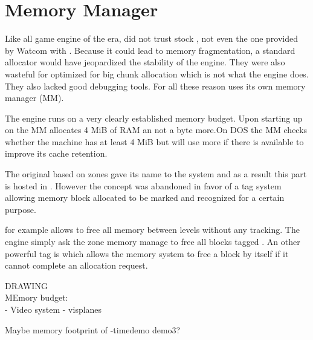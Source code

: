 \section{Memory Manager}
Like all game engine of the era, \doom did not trust stock , not even the one provided by Watcom with . Because it could lead to memory fragmentation, a standard allocator would have jeopardized the stability of the engine. They were also wasteful for optimized for big chunk allocation which is not what the engine does. They also lacked good debugging tools. For all these reason \doom uses its own memory manager (MM).\\
\par

The engine runs on a very clearly established memory budget. Upon starting up on \NeXT the MM allocates 4 MiB of RAM an not a byte more.On DOS the MM checks whether the machine has at least 4 MiB but will use more if there is available to improve its cache retention.\\
\par
The original based on zones gave its name to the system and as a result this part is hosted in . However the concept was abandoned in favor of a tag system allowing memory block allocated to be marked and recognized for a certain purpose.\\
\par
{}
\par
{} for example allows \doom to free all memory between levels without any tracking. The engine simply ask the zone memory manage to free all blocks tagged . An other powerful tag is  which allows the memory system to free a block by itself if it cannot complete an allocation request. \\
\par
  
\par
{}
\par


DRAWING\\
MEmory budget:\\
- Video system
- visplanes
\par
Maybe memory footprint of -timedemo demo3?\\
\pagebreak